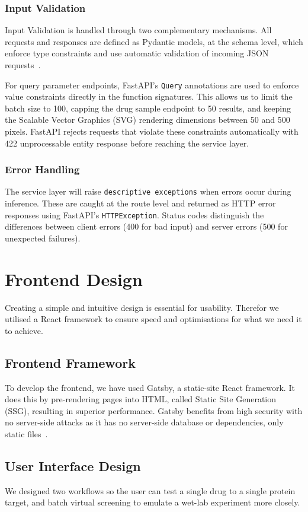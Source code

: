 \subsubsection{Input Validation}
Input Validation is handled through two complementary mechanisms.
All requests and responses are defined as Pydantic models, at the schema level, which enforce type constraints and use automatic validation of incoming JSON requests~\citep{pydantic}.

For query parameter endpoints, FastAPI's \texttt{Query} annotations are used to enforce value constraints directly in the function signatures.
This allows us to limit the batch size to 100, capping the drug sample endpoint to 50 results, and keeping the Scalable Vector Graphics (SVG) rendering dimensions between 50 and 500 pixels.
FastAPI rejects requests that violate these constraints automatically with 422 unprocessable entity response before reaching the service layer.
\subsubsection{Error Handling}
The service layer will raise \texttt{descriptive exceptions} when errors occur during inference.
These are caught at the route level and returned as HTTP error responses using FastAPI's \texttt{HTTPException}.
Status codes distinguish the differences between client errors (400 for bad input) and server errors (500 for unexpected failures).

\section{Frontend Design}
Creating a simple and intuitive design is essential for usability.
Therefor we utilised a React framework to ensure speed and optimisations for what we need it to achieve.
\subsection{Frontend Framework}
To develop the frontend, we have used Gatsby, a static-site React framework.
It does this by pre-rendering pages into HTML, called Static Site Generation (SSG), resulting in superior performance.
Gatsby benefits from high security with no server-side attacks as it has no server-side database or dependencies, only static files~\citep{gatsby_definitive, gatsby}.

\subsection{User Interface Design}
We designed two workflows so the user can test a single drug to a single protein target, and batch virtual screening to emulate a wet-lab experiment more closely.
